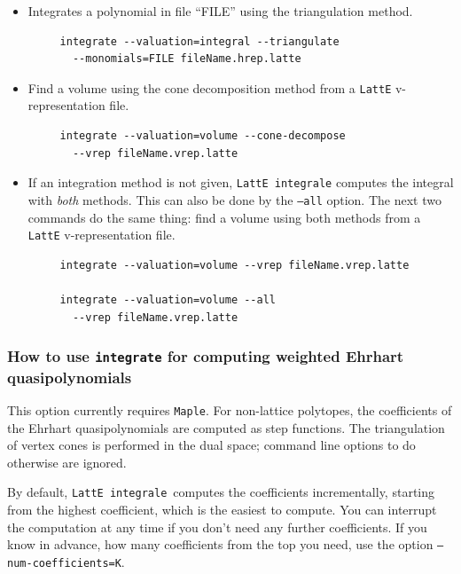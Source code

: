 \documentclass{article}
\newcommand{\latte}{{\tt LattE}\xspace}
\newcommand{\latteInt}{{\tt LattE integrale}\xspace}
\newcommand{\maple}{{\tt Maple}\xspace}
\begin{document}
\begin{itemize}
\item Integrates a polynomial in file ``FILE'' using the triangulation method. 
        \begin{verbatim}
     integrate --valuation=integral --triangulate 
       --monomials=FILE fileName.hrep.latte
        \end{verbatim}  
\item Find a volume using the cone decomposition method from a \latte v-representation file.
        \begin{verbatim}
     integrate --valuation=volume --cone-decompose 
       --vrep fileName.vrep.latte
        \end{verbatim}  
\item If an integration method is not given, \latteInt computes the integral with \emph{both} methods. This can also be done by the {\tt --all} option. The next two commands do the same thing: find a volume using both methods from a \latte v-representation file.
        \begin{verbatim}
     integrate --valuation=volume --vrep fileName.vrep.latte

     integrate --valuation=volume --all 
       --vrep fileName.vrep.latte 
        \end{verbatim}  
\end{itemize}


\subsubsection{How to use {\tt integrate} for computing weighted Ehrhart quasi\-polynomials}           
\label{s:top-ehrhart}

This option currently requires \maple.
For non-lattice polytopes, the coefficients of the Ehrhart quasipolynomials
are computed as step functions. 
The triangulation of vertex cones is performed in the dual space; command line
options to do otherwise are ignored.

By default, \latteInt\ computes the coefficients incrementally, starting from
the highest coefficient, which is the easiest to compute.  
You can interrupt the computation at any time if you
don't need any further coefficients. 
If you know in advance, how many coefficients from the top you need, use  the
option \texttt{--num-coefficients=K}. 

\end{document}
